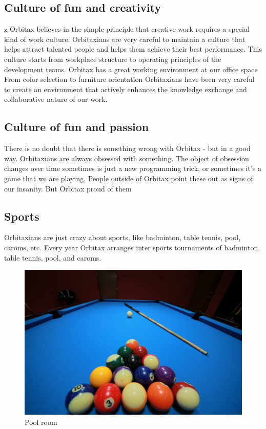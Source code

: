 \begin{flushleft}
\subsection{Culture of fun and creativity}
z Orbitax believes in the simple principle that creative work requires a special kind of work culture. Orbitaxians are very careful to maintain a culture that helps attract talented people and helps them achieve their best performance. This culture starts from workplace structure to operating principles of the development teams. Orbitax has a great working environment at our office space From color selection to furniture orientation Orbitaxians have been very careful to create an environment that actively enhances the knowledge exchange and collaborative nature of our work.




\subsection{Culture of fun and passion}
There is no doubt that there is something wrong with Orbitax - but in a good way. Orbitaxians are always obsessed with something. The object of obsession changes over time sometimes is just a new programming trick, or sometimes it’s a game that we are playing. People outside of Orbitax point these out as signs of our insanity. But Orbitax proud of them


\subsection{Sports}
Orbitaxians are just crazy about sports, like badminton, table tennis, pool, caroms, etc. Every year Orbitax arranges inter sports tournaments of badminton, table tennis, pool, and caroms.
 \begin{figure}[htbp]
\centerline{\includegraphics[scale=0.1]{Figures/sport.jpg}}
\caption{Pool room}
\label{fig}
\end{figure}


\end{flushleft}
